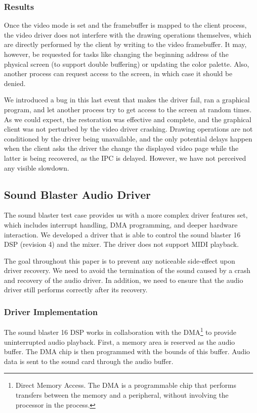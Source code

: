\documentclass{report}
\begin{document}
\subsubsection{Results}
Once the video mode is set and the framebuffer is mapped to the client process, the video driver does not interfere with the drawing operations themselves, which are directly performed by the client by writing to the video framebuffer. It may, however, be requested for tasks like changing the beginning address of the physical screen (to support double buffering) or updating the color palette. Also, another process can request access to the screen, in which case it should be denied.

We introduced a bug in this last event that makes the driver fail, ran a graphical program, and let another process try to get access to the screen at random times. As we could expect, the restoration was effective and complete, and the graphical client was not perturbed by the video driver crashing. Drawing operations are not conditioned by the driver being unavailable, and the only potential delays happen when the client asks the driver the change the displayed video page while the latter is being recovered, as the IPC is delayed. However, we have not perceived any visible slowdown.

\subsection{Sound Blaster Audio Driver}
The sound blaster test case provides us with a more complex driver features set, which includes interrupt handling, DMA programming, and deeper hardware interaction. We developed a driver that is able to control the sound blaster 16 DSP (revision 4) and the mixer. The driver does not support MIDI playback.

The goal throughout this paper is to prevent any noticeable side-effect upon driver recovery.  We need to avoid the termination of the sound caused by a crash and recovery of the audio driver.  In addition, we need to ensure that the audio driver still performs correctly after its recovery.

\subsubsection{Driver Implementation}
The sound blaster 16 DSP works in collaboration with the DMA\footnote{Direct Memory Access. The DMA is a programmable chip that performs transfers between the memory and a peripheral, without involving the processor in the process.} to provide uninterrupted audio playback. First, a memory area is reserved as the audio buffer. The DMA chip is then programmed with the bounds of this buffer. Audio data is sent to the sound card through the audio buffer.
\end{document}
